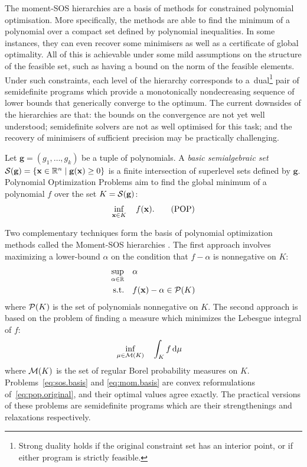 The moment-SOS hierarchies are a basis of methods for constrained polynomial optimisation. More specifically, the methods are able to find the minimum of a polynomial over a compact set defined by polynomial inequalities. In some instances, they can even recover some minimisers as well as a certificate of global optimality. All of this is achievable under some mild assumptions on the structure of the feasible set, such as having a bound on the norm of the feasible elements. Under such constraints, each level of the hierarchy corresponds to a~dual\footnote{Strong duality holds if the original constraint set has an interior point, or if either program is strictly feasible.} pair of semidefinite programs which provide a monotonically nondecreasing sequence of lower bounds that generically converge \cite{Nie2014} to the optimum. The current downsides of the hierarchies are that: the bounds on the convergence are not yet well understood; semidefinite solvers are not as well optimised for this task; and the recovery of minimisers of sufficient precision may be practically challenging.

Let $\mathbf{g} = (g_1,\dots,g_k)$ be a tuple of polynomials. A \emph{basic semialgebraic set} \( \mathcal{S}(\mathbf{g}) = \{\mathbf{x} \in \mathbb{R}^n \mid \mathbf{g}(\mathbf{x}) \ge 0\} \) is a finite intersection of superlevel sets defined by $\mathbf{g}$. Polynomial Optimization Problems aim to find the global minimum of a polynomial $f$ over the set $K=\mathcal{S}(\mathbf{g})$:
\begin{equation}\label{eq:pop.original}
    \inf_{\mathbf{x} \in K} \quad f(\mathbf{x}).\tag{POP}
\end{equation}

Two complementary techniques form the basis of polynomial optimization methods called the Moment-SOS hierarchies \cite{Lasserre15:book}. The first approach involves maximizing a lower-bound $\alpha$ on the condition that $f-\alpha$ is nonnegative on $K$:
\begin{equation}\label{eq:sos.basis}
    \begin{aligned}
        \sup_{\alpha \in \mathbb{R}}\quad&\alpha\\
        \text{\normalfont s.t.}\quad&f(\mathbf{x}) - \alpha \in \mathcal{P}(K)
    \end{aligned}
\end{equation}
where $\mathcal{P}(K)$ is the set of polynomials nonnegative on $K$. The second approach is based on the problem of finding a measure which minimizes the Lebesgue integral of $f$:
\begin{equation}\label{eq:mom.basis}
    \begin{aligned}
        \inf_{\mu\in \mathcal{M}(K)}\quad&\int_K f \mathop{}\!\mathrm{d} \mu
    \end{aligned}
\end{equation}
where $\mathcal{M}(K)$ is the set of regular Borel probability measures on $K$. Problems~\ref{eq:sos.basis} and \ref{eq:mom.basis} are convex reformulations of~\ref{eq:pop.original}, and their optimal values agree exactly. The practical versions of these problems are semidefinite programs which are their strengthenings and relaxations respectively.

